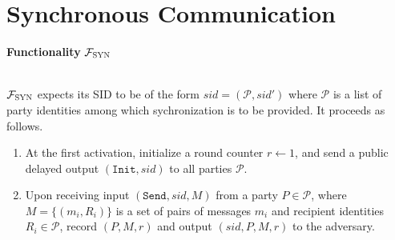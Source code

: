 \documentclass[a4paper]{article}
\newcommand{\F}{\mathcal{F}}
\begin{document}


\section{Synchronous Communication}

\begin{framed}
    \centerline{\textbf{Functionality} $\F_{\textsc{SYN}}$}
    \ \\
    \noindent $\F_{\textsc{SYN}}$ expects its SID to be of the form $sid = (\mathcal{P}, sid')$ where $\mathcal{P}$ is a list of party identities among which sychronization is to be provided. It proceeds as follows.
    
    \begin{enumerate}
        \item At the first activation, initialize a round counter $r \leftarrow 1$, and send a public delayed output $(\texttt{Init}, sid)$ to all parties $\mathcal{P}$.

        \item Upon receiving input $(\texttt{Send}, sid, M)$ from a party $P \in \mathcal{P}$, where $M = \{(m_i, R_i)\}$ is a set of pairs of messages $m_i$ and recipient identities $R_i \in \mathcal{P}$, record $(P, M, r)$ and output $(sid, P, M, r)$ to the adversary.


\end{enumerate}
\end{framed}
\end{document}
